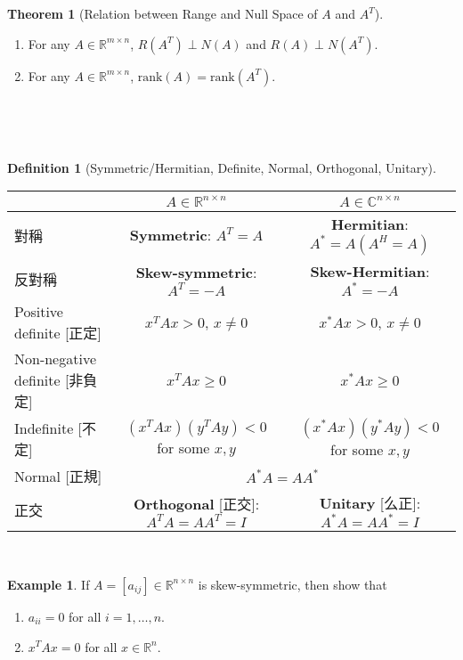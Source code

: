 \documentclass{article}
\theoremstyle{definition}
\newtheorem{definition}{Definition}[section]
\newtheorem{theorem}{Theorem}[section]
\newtheorem{example}{Example}[section]
\numberwithin{theorem}{section}
\numberwithin{equation}{section}
\begin{document}
\begin{theorem}[Relation between Range and Null Space of $A$ and $A^{T}$]

    \begin{enumerate} 
\item For any $A\in \mathbb{R}^{m\times n}$, $R(A^T) \perp N(A)$ and $R(A) \perp N(A^T)$.
\item For any $A\in \mathbb{R}^{m\times n}$, $\text{rank}(A) = \text{rank}(A^T)$.

\end{enumerate}  
\end{theorem} 
\begin{definition}[Symmetric/Hermitian, Definite, Normal, Orthogonal, Unitary] \begin{table}[!h]
    \centering
    \begin{tabular}{|l|c|c|} \hline 
         &  $A \in \mathbb{R}^{n \times n}$& $A \in \mathbb{C}^{n \times n}$\\ \hline 
         對稱&  \textbf{Symmetric}: $A^T = A$& \textbf{Hermitian}: $A^* = A (A^H = A)$\\ \hline 
         反對稱&  \textbf{Skew-symmetric}: $A^T = -A$& \textbf{Skew-Hermitian}: $A^* = -A$\\ \hline 
         Positive definite [正定]&  $x^T A x > 0$, $x \neq 0$& $x^* A x > 0$, $x \neq 0$\\ \hline 
         Non-negative definite [非負定]&  $x^T A x \geq 0$& $x^* Ax \geq 0$\\ \hline 
         Indefinite [不定] &  $(x^T A x)(y^T A y) < 0$ for some $x, y$& $(x^* A x)(y^* A y) < 0$ for some $x, y$\\ \hline 

         Normal [正規]&  \multicolumn{2}{|c|}{$A^* A = A A^*$}\\ \hline 
         正交&  \textbf{Orthogonal} [正交]: $A^TA=AA^T= I$& \textbf{Unitary} [么正]: $A^* A = A A^* = I$\\ \hline
    \end{tabular}
\end{table} 
\end{definition}

\begin{example}
If $A=[a_{ij}]\in \mathbb{R}^{n\times n}$ is skew-symmetric, then show that
\begin{enumerate}
\item $a_{ii}=0$ for all $i=1,\ldots,n.$
\item $x^TAx=0$ for all $x\in\mathbb{R}^n$.
\end{enumerate}
\end{example}
\end{document}
